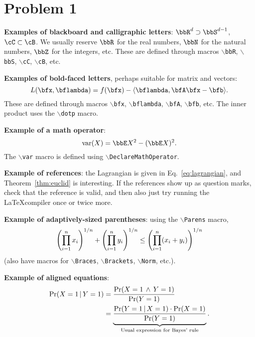 \documentclass[twoside,11pt]{homework}
\begin{document}
\maketitle

\section*{Problem 1}


\textbf{Examples of blackboard and calligraphic letters}: $\bbR^d
\supset \bbS^{d-1}$, $\cC \subset \cB$.
We usually reserve $\bbR$ for the real numbers, $\bbN$ for the natural
numbers, $\bbZ$ for the integers, etc.
These are defined through macros
\texttt{$\backslash$bbR},
\texttt{$\backslash$bbS},
\texttt{$\backslash$cC},
\texttt{$\backslash$cB},
etc.

\textbf{Examples of bold-faced letters}, perhaps suitable for matrix
and vectors:
\begin{equation}
  L(\bfx,\bflambda) = f(\bfx) - \dotp{\bflambda,\bfA\bfx-\bfb} .
  \label{eq:lagrangian}
\end{equation}
These are defined through macros
\texttt{$\backslash$bfx},
\texttt{$\backslash$bflambda},
\texttt{$\backslash$bfA},
\texttt{$\backslash$bfb},
etc.
The inner product uses the
\texttt{$\backslash$dotp}
macro.

\textbf{Example of a math operator}:
\[
  \var(X) = \bbE X^2 - (\bbE X)^2 .
\]
The
\texttt{$\backslash$var}
macro is defined using
\texttt{$\backslash$DeclareMathOperator}.

\textbf{Example of references}: the Lagrangian is given in
Eq.~\eqref{eq:lagrangian}, and Theorem~\ref{thm:euclid} is
interesting.
If the references show up as question marks, check that the reference
is valid, and then also just try running the \LaTeX compiler once or
twice more.

\textbf{Example of adaptively-sized parentheses}:
using the \texttt{$\backslash$Parens} macro,
\[
  \left(\prod_{i=1}^n x_i\right)^{1/n}
  + \left(\prod_{i=1}^n y_i\right)^{1/n}
  \leq
  \left(
    \prod_{i=1}^n (x_i + y_i)
  \right)^{1/n}
\]
(also have macros for \texttt{$\backslash$Braces},
\texttt{$\backslash$Brackets}, \texttt{$\backslash$Norm}, etc.).

\textbf{Example of aligned equations}:
\begin{align}
  \Pr(X = 1 \,|\, Y = 1)
  & = \frac{\Pr(X = 1 \,\wedge\, Y = 1)}{\Pr(Y = 1)}
  \notag \\
  & =
  \underbrace{
    \frac{\Pr(Y = 1 \,|\, X = 1) \cdot \Pr(X = 1)}{\Pr(Y = 1)}
  }_{\text{Usual expression for Bayes' rule}}
  .
  \label{eq:bayes-rule}
\end{align}
\end{document}
